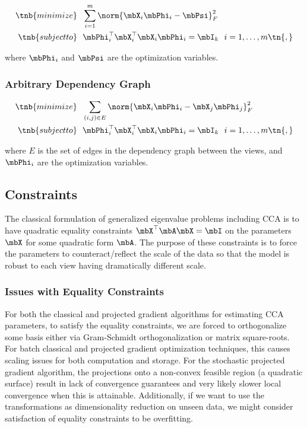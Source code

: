 \documentclass{article}
\begin{document}
	\begin{align*}
		\tnb{minimize}&\ \ \sum_{i=1}^m \norm{\mbX_i \mbPhi_i - \mbPsi}_F^2\\
		\tnb{subject to}&\ \  \mbPhi_i^{\top}\mbX_i^{\top}\mbX_i\mbPhi_i = \mbI_k\ \ i=1,\ldots,m \tn{,}
	\end{align*}
	
	\noindent where $\mbPhi_i$ and $\mbPsi$ are the optimization variables.

	\subsubsection{Arbitrary Dependency Graph} \label{subsubsec:arbdepgraph}
	
	\begin{align*}
		\tnb{minimize}&\ \ \sum_{(i,j) \in E}\norm{\mbX_i \mbPhi_i - \mbX_j \mbPhi_j}_F^2\\
		\tnb{subject to}&\ \  \mbPhi_i^{\top}\mbX_i^{\top}\mbX_i\mbPhi_i = \mbI_k\ \ i=1,\ldots,m \tn{,}
	\end{align*}
	
	\noindent where $E$ is the set of edges in the dependency graph between the views, and $\mbPhi_i$ are the optimization variables.
	
	\subsection{Constraints} \label{subsec:constraints}
	The classical formulation of generalized eigenvalue problems including CCA is to have quadratic equality constraints $\mbX^{\top}\mbA\mbX = \mbI$ on the parameters $\mbX$ for some quadratic form $\mbA$. The purpose of these constraints is to force the parameters to counteract/reflect the scale of the data so that the model is robust to each view having dramatically different scale.
	
	\subsubsection{Issues with Equality Constraints} \label{subsubsec:issueswithequality}
	For both the classical and projected gradient algorithms for estimating CCA parameters, to satisfy the equality constraints, we are forced to orthogonalize some basis either via Gram-Schmidt orthogonalization or matrix square-roots. For batch classical and projected gradient optimization techniques, this causes scaling issues for both computation and storage. For the stochastic projected gradient algorithm, the projections onto a non-convex feasible region (a quadratic surface) result in lack of convergence guarantees and very likely slower local convergence when this is attainable. Additionally, if we want to use the transformations as dimensionality reduction on unseen data, we might consider satisfaction of equality constraints to be overfitting.
	
\end{document}
